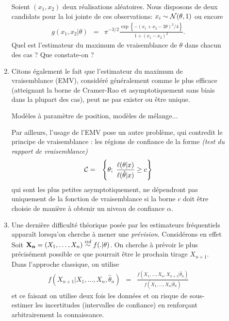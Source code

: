 \begin{description}
\begin{enumerate}
        
\begin{exec}\label{exo1}
            Soient $(x_1,x_2)$ deux réalisations aléatoires. Nous disposons de deux candidats pour la loi jointe de ces observations: $x_i\sim {\cal{N}}(\theta,1)$ ou encore
            \begin{eqnarray*}
g(x_1,x_2|\theta) & = & \pi^{-3/2}\frac{\exp\left\{-(x_1 + x_2 - 2\theta)^2/4\right\}}{1+(x_1-x_2)^2}.
\end{eqnarray*}
Quel est l'estimateur du maximum de vraisemblance de $\theta$ dans chacun des cas ? Que constate-on ?
        \end{exec}

\if{} 
\fi
       
       

       \item Citons également le fait que l'estimateur du maximum de vraisemblance (EMV), considéré généralement comme le plus efficace (atteignant la borne de Cramer-Rao et asymptotiquement sans biais dans la plupart des cas), peut ne pas exister ou être unique. \\
       
       \begin{exo} Modèles à paramètre de position, modèles de mélange... \\
       \end{exo}
       
       Par ailleurs, l'usage de l'EMV pose un autre problème, qui contredit le principe de vraisemblance : les régions de confiance de la forme {\it (test du rapport de vraisemblance)}
\begin{eqnarray*}
{\cal{C}} & = & \left\{\theta; \ \frac{\ell(\theta|x)}{\ell(\hat{\theta}|x)} \geq c\right\} 
\end{eqnarray*}
qui sont les plus petites asymptotiquement, ne dépendront pas uniquement de la fonction de vraisemblance si la borne $c$ doit \^etre choisie de manière à obtenir un niveau de confiance $\alpha$. \\
       
       \item Une dernière difficulté théorique posée par les estimateurs fréquentiels appara\^it lorsqu'on cherche à mener une \emph{prévision}. Considérons en effet Soit ${\bf X_n}=(X_1,\ldots,X_n) \overset{iid}{\sim} f(.|\theta)$. On cherche à prévoir le plus précisément possible ce que pourrait \^etre le prochain tirage $X_{n+1}$. Dans l'approche classique, on utilise 
       \begin{eqnarray*}
 f(X_{n+1}|X_1,\ldots,X_n,\hat{\theta}_n) & = & \frac{f(X_1,\ldots,X_n,X_{n+1}|\hat{\theta}_n)}{f(X_1,\ldots,X_n|\hat{\theta}_n)}
\end{eqnarray*}
et ce faisant on utilise deux fois les données et on risque de sous-estimer les incertitudes (intervalles de confiance) en renfor\c cant arbitrairement la connaissance.
        

\end{enumerate}
\end{description}
